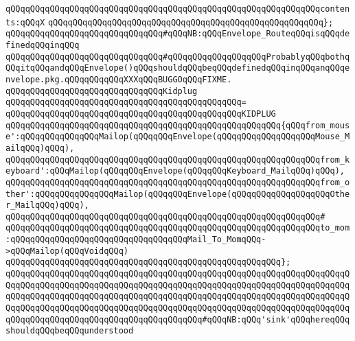\verb|qQQqqQQqqQQqqQQqqQQqqQQqqQQqqQQqqQQqqQQqqQQqqQQqqQQqqQQqqQQqqQQqcontents:qQQqX|\newline
\verb|qQQqqQQqqQQqqQQqqQQqqQQqqQQqqQQqqQQqqQQqqQQqqQQqqQQqqQQq};|\newline
\newline
\verb|qQQqqQQqqQQqqQQqqQQqqQQqqQQqqQQq#qQQqNB:qQQqEnvelope_RouteqQQqisqQQqdefinedqQQqinqQQq|\newline
\verb|qQQqqQQqqQQqqQQqqQQqqQQqqQQqqQQq#qQQqqQQqqQQqqQQqqQQqProbablyqQQqbothqQQqitqQQqandqQQqEnvelope()qQQqshouldqQQqbeqQQqdefinedqQQqinqQQqanqQQqenvelope.pkg.qQQqqQQqqQQqXXXqQQqBUGGOqQQqFIXME.|\newline
\newline
\verb|qQQqqQQqqQQqqQQqqQQqqQQqqQQqqQQqKidplug|\newline
\verb|qQQqqQQqqQQqqQQqqQQqqQQqqQQqqQQqqQQqqQQqqQQqqQQq=|\newline
\verb|qQQqqQQqqQQqqQQqqQQqqQQqqQQqqQQqqQQqqQQqqQQqqQQqKIDPLUG|\newline
\verb|qQQqqQQqqQQqqQQqqQQqqQQqqQQqqQQqqQQqqQQqqQQqqQQqqQQqqQQq{qQQqfrom_mouse':qQQqqQQqqQQqqQQqMailop(qQQqqQQqEnvelope(qQQqqQQqqQQqqQQqqQQqMouse_MailqQQq)qQQq),|\newline
\verb|qQQqqQQqqQQqqQQqqQQqqQQqqQQqqQQqqQQqqQQqqQQqqQQqqQQqqQQqqQQqqQQqfrom_keyboard':qQQqMailop(qQQqqQQqEnvelope(qQQqqQQqKeyboard_MailqQQq)qQQq),|\newline
\verb|qQQqqQQqqQQqqQQqqQQqqQQqqQQqqQQqqQQqqQQqqQQqqQQqqQQqqQQqqQQqqQQqfrom_other':qQQqqQQqqQQqqQQqMailop(qQQqqQQqEnvelope(qQQqqQQqqQQqqQQqqQQqOther_MailqQQq)qQQq),|\newline
\verb|qQQqqQQqqQQqqQQqqQQqqQQqqQQqqQQqqQQqqQQqqQQqqQQqqQQqqQQqqQQqqQQq#|\newline
\verb|qQQqqQQqqQQqqQQqqQQqqQQqqQQqqQQqqQQqqQQqqQQqqQQqqQQqqQQqqQQqqQQqto_mom:qQQqqQQqqQQqqQQqqQQqqQQqqQQqqQQqqQQqMail_To_MomqQQq->qQQqMailop(qQQqVoidqQQq)|\newline
\verb|qQQqqQQqqQQqqQQqqQQqqQQqqQQqqQQqqQQqqQQqqQQqqQQqqQQqqQQq};|\newline
\newline
\verb|qQQqqQQqqQQqqQQqqQQqqQQqqQQqqQQqqQQqqQQqqQQqqQQqqQQqqQQqqQQqqQQqqQQqqQQqqQQqqQQqqQQqqQQqqQQqqQQqqQQqqQQqqQQqqQQqqQQqqQQqqQQqqQQqqQQqqQQqqQQqqQQqqQQqqQQqqQQqqQQqqQQqqQQqqQQqqQQqqQQqqQQqqQQqqQQqqQQqqQQqqQQqqQQqqQQqqQQqqQQqqQQqqQQqqQQqqQQqqQQqqQQqqQQqqQQqqQQqqQQqqQQqqQQqqQQqqQQqqQQqqQQqqQQqqQQqqQQqqQQqqQQqqQQqqQQqqQQqqQQq#qQQqNB:qQQq'sink'qQQqhereqQQqshouldqQQqbeqQQqunderstood|\newline
